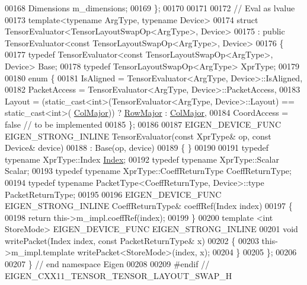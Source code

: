 \begin{DoxyCode}
00168   Dimensions m\_dimensions;
00169 \};
00170 
00171 
00172 \textcolor{comment}{// Eval as lvalue}
00173 \textcolor{keyword}{template}<\textcolor{keyword}{typename} ArgType, \textcolor{keyword}{typename} Device>
00174   \textcolor{keyword}{struct }TensorEvaluator<TensorLayoutSwapOp<ArgType>, Device>
00175   : \textcolor{keyword}{public} TensorEvaluator<const TensorLayoutSwapOp<ArgType>, Device>
00176 \{
00177   \textcolor{keyword}{typedef} TensorEvaluator<const TensorLayoutSwapOp<ArgType>, Device> Base;
00178   \textcolor{keyword}{typedef} TensorLayoutSwapOp<ArgType> XprType;
00179 
00180   \textcolor{keyword}{enum} \{
00181     IsAligned = TensorEvaluator<ArgType, Device>::IsAligned,
00182     PacketAccess = TensorEvaluator<ArgType, Device>::PacketAccess,
00183     Layout = (\textcolor{keyword}{static\_cast<}\textcolor{keywordtype}{int}\textcolor{keyword}{>}(TensorEvaluator<ArgType, Device>::Layout) == static\_cast<int>(
      \hyperlink{group__enums_ggaacded1a18ae58b0f554751f6cdf9eb13a0cbd4bdd0abcfc0224c5fcb5e4f6669a}{ColMajor})) ? \hyperlink{group__enums_ggaacded1a18ae58b0f554751f6cdf9eb13acfcde9cd8677c5f7caf6bd603666aae3}{RowMajor} : \hyperlink{group__enums_ggaacded1a18ae58b0f554751f6cdf9eb13a0cbd4bdd0abcfc0224c5fcb5e4f6669a}{ColMajor},
00184     CoordAccess = \textcolor{keyword}{false}  \textcolor{comment}{// to be implemented}
00185   \};
00186 
00187   EIGEN\_DEVICE\_FUNC EIGEN\_STRONG\_INLINE TensorEvaluator(\textcolor{keyword}{const} XprType& op, \textcolor{keyword}{const} Device& device)
00188     : Base(op, device)
00189   \{ \}
00190 
00191   \textcolor{keyword}{typedef} \textcolor{keyword}{typename} XprType::Index \hyperlink{namespace_eigen_a62e77e0933482dafde8fe197d9a2cfde}{Index};
00192   \textcolor{keyword}{typedef} \textcolor{keyword}{typename} XprType::Scalar Scalar;
00193   \textcolor{keyword}{typedef} \textcolor{keyword}{typename} XprType::CoeffReturnType CoeffReturnType;
00194   \textcolor{keyword}{typedef} \textcolor{keyword}{typename} PacketType<CoeffReturnType, Device>::type PacketReturnType;
00195 
00196   EIGEN\_DEVICE\_FUNC EIGEN\_STRONG\_INLINE CoeffReturnType& coeffRef(Index index)
00197   \{
00198     \textcolor{keywordflow}{return} this->m\_impl.coeffRef(index);
00199   \}
00200   \textcolor{keyword}{template} <\textcolor{keywordtype}{int} StoreMode> EIGEN\_DEVICE\_FUNC EIGEN\_STRONG\_INLINE
00201   \textcolor{keywordtype}{void} writePacket(Index index, \textcolor{keyword}{const} PacketReturnType& x)
00202   \{
00203     this->m\_impl.template writePacket<StoreMode>(index, x);
00204   \}
00205 \};
00206 
00207 \} \textcolor{comment}{// end namespace Eigen}
00208 
00209 \textcolor{preprocessor}{#endif // EIGEN\_CXX11\_TENSOR\_TENSOR\_LAYOUT\_SWAP\_H}
\end{DoxyCode}
